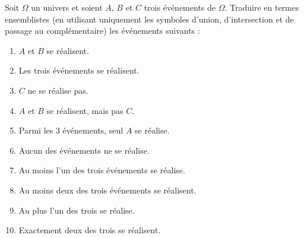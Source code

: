 \documentclass[11pt,a4paper]{article}
\begin{document}
Soit $\Omega$ un univers et soient $A$, $B$ et $C$ trois événements de $\Omega$. Traduire en termes ensemblistes (en utilisant uniquement les symboles d'union, d'intersection et de passage au complémentaire) les événements suivants :
\begin{enumerate}[label=\arabic*.]
    \item $A$ et $B$ se réalisent.
    \item Les trois événements se réalisent.
    \item $C$ ne se réalise pas.
    \item $A$ et $B$ se réalisent, mais pas $C$.
    \item Parmi les 3 événements, seul $A$ se réalise.
    \item Aucun des événements ne se réalise.
    \item Au moins l'un des trois événements se réalise.
    \item Au moins deux des trois événements se réalisent.
    \item Au plus l'un des trois se réalise.
    \item Exactement deux des trois se réalisent.
\end{enumerate}
\end{document}
